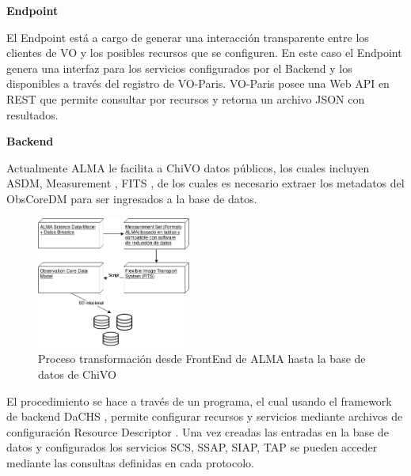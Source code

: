 \textbf{Endpoint}

El Endpoint está a cargo de generar una interacción transparente entre los clientes
de VO y los posibles recursos que se configuren.
En este caso el Endpoint genera una interfaz para los servicios configurados por el
Backend y los disponibles a través del registro de VO-Paris.
VO-Paris posee una Web API en REST que permite consultar por recursos y retorna un
archivo JSON con resultados.

\textbf{Backend}

Actualmente ALMA le facilita a ChiVO datos públicos, los cuales incluyen ASDM,
Measurement \cite{petry2012analysing}, FITS \cite{wells1981fits}, de los cuales es
necesario extraer los metadatos del ObsCoreDM para ser ingresados a la base de datos.

\begin{figure}[h]
    \centering
    \includegraphics[width=0.45\textwidth]{images/metadata.png}
    \caption{Proceso transformación desde FrontEnd de ALMA hasta la base de datos de ChiVO}
    \label{fig:metadata}
\end{figure}

El procedimiento se hace a través de un programa, el cual usando el framework de
backend DaCHS \cite{dachs}, permite configurar recursos y servicios mediante
archivos de configuración Resource Descriptor \cite{dachsorguide}.
Una vez creadas las entradas en la base de datos y configurados los servicios SCS,
SSAP, SIAP, TAP se pueden acceder mediante las consultas definidas en cada protocolo.
